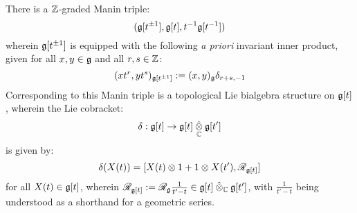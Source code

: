            \begin{proposition} \label{prop: the_yangian_manin_triple}
                There is a $\mathbb{Z}$-graded Manin triple:
                    $$( \mathfrak{g}[t^{\pm 1}], \mathfrak{g}[t], t^{-1}\mathfrak{g}[t^{-1}] )$$
                wherein $\mathfrak{g}[t^{\pm 1}]$ is equipped with the following \textit{a priori} invariant inner product, given for all $x, y \in \mathfrak{g}$ and all $r, s \in \mathbb{Z}$:
                    $$(x t^r, y t^s)_{\mathfrak{g}[t^{\pm 1}]} := (x, y)_{\mathfrak{g}} \delta_{r + s, -1}$$
                Corresponding to this Manin triple is a topological Lie bialgebra structure on $\mathfrak{g}[t]$, wherein the Lie cobracket:
                    $$\delta: \g[t] \to \g[t] \hattensor_{\bbC} \g[t']$$
                is given by:
                    $$\delta(X(t)) = [ X(t) \tensor 1 + 1 \tensor X(t'), \scrR_{\g[t]} ]$$
                for all $X(t) \in \mathfrak{g}[t]$, wherein $\scrR_{\g[t]} := \scrR_{\g} \frac{1}{t' - t} \in \g[t] \hattensor_{\bbC} \g[t']$, with $\frac{1}{t' - t}$ being understood as a shorthand for a geometric series.
            \end{proposition}
